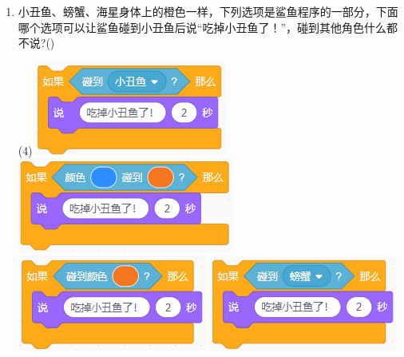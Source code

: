 \documentclass[10pt, a4paper]{article}
\begin{document}
\begin{enumerate}
        ~比赛结束后四个队的得分都是奇数； 

        ~A队总分第一； 

        ~B队恰有两场平局，并且其中一场是与C队平局。 
        
        问：D队得几分?(\qquad)
        \begin{tasks}(4)
        \end{tasks}

        \item 小丑鱼、螃蟹、海星身体上的橙色一样，下列选项是鲨鱼程序的一部分，下面哪个选项可以让鲨鱼碰到小丑鱼后说“吃掉小丑鱼了！”，碰到其他角色什么都不说?(\qquad)
        \begin{tasks}(4)
            \task \includegraphics[width=.18\textwidth]{23a.png}
            \task \includegraphics[width=.18\textwidth]{23b.png}
            \task \includegraphics[width=.18\textwidth]{23c.png}
            \task \includegraphics[width=.18\textwidth]{23d.png}
        \end{tasks}


\end{enumerate}
\end{document}
